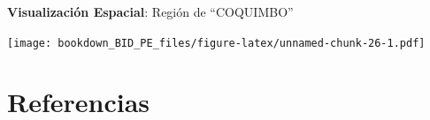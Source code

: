 \documentclass[
]{book}
\newlength{\cslhangindent}
\newlength{\cslentryspacingunit} %
\newenvironment{CSLReferences}[2] %
 {%
  \setlength{\parindent}{0pt}
  \ifodd #1
  \let\oldpar\par
  \def\par{\hangindent=\cslhangindent\oldpar}
  \fi
  \setlength{\parskip}{#2\cslentryspacingunit}
 }%
 {}
\begin{document}
\textbf{Visualización Espacial}: Región de ``COQUIMBO''

\texttt{[image: bookdown\_BID\_PE\_files/figure-latex/unnamed-chunk-26-1.pdf]}

\hypertarget{referencias}{%
\chapter{Referencias}\label{referencias}}

\hypertarget{refs}{}
\begin{CSLReferences}{0}{0}
\end{CSLReferences}

  
\end{document}
